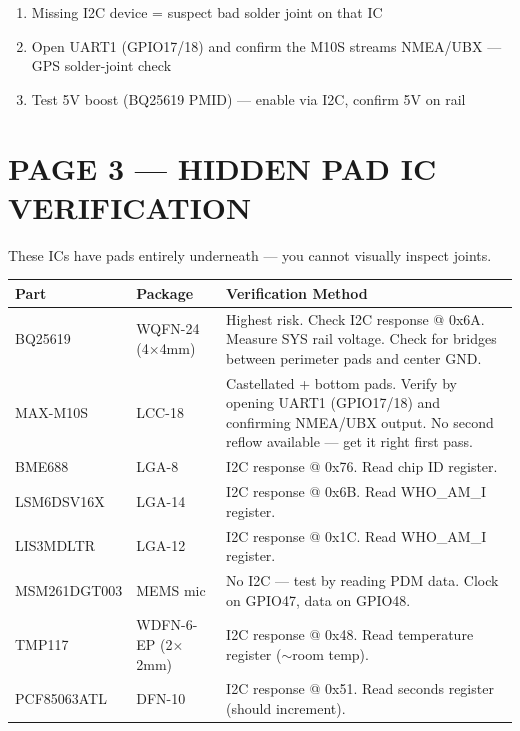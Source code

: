 \documentclass[11pt,a4paper]{article}
\begin{document}
\begin{enumerate}[nosep,start=6]
\item Missing I2C device = suspect bad solder joint on that IC
\item Open UART1 (GPIO17/18) and confirm the M10S streams NMEA/UBX — GPS solder-joint check
\item Test 5V boost (BQ25619 PMID) — enable via I2C, confirm 5V on rail
\end{enumerate}

\newpage
\section*{PAGE 3 — HIDDEN PAD IC VERIFICATION}

These ICs have pads entirely underneath — you cannot visually inspect joints.

\begin{table}[H]
\centering
\renewcommand{\arraystretch}{1.3}
\begin{tabular}{@{}p{3.2cm}p{3cm}p{8cm}@{}}
\toprule
\textbf{Part} & \textbf{Package} & \textbf{Verification Method} \\
\midrule
BQ25619 & WQFN-24 (4$\times$4mm) & Highest risk. Check I2C response @ 0x6A. Measure SYS rail voltage. Check for bridges between perimeter pads and center GND. \\
MAX-M10S & LCC-18 & Castellated + bottom pads. Verify by opening UART1 (GPIO17/18) and confirming NMEA/UBX output. No second reflow available — get it right first pass. \\
BME688 & LGA-8 & I2C response @ 0x76. Read chip ID register. \\
LSM6DSV16X & LGA-14 & I2C response @ 0x6B. Read WHO\_AM\_I register. \\
LIS3MDLTR & LGA-12 & I2C response @ 0x1C. Read WHO\_AM\_I register. \\
MSM261DGT003 & MEMS mic & No I2C — test by reading PDM data. Clock on GPIO47, data on GPIO48. \\
TMP117 & WDFN-6-EP (2$\times$2mm) & I2C response @ 0x48. Read temperature register ($\sim$room temp). \\
PCF85063ATL & DFN-10 & I2C response @ 0x51. Read seconds register (should increment). \\
\bottomrule
\end{tabular}
\end{table}
\end{document}
